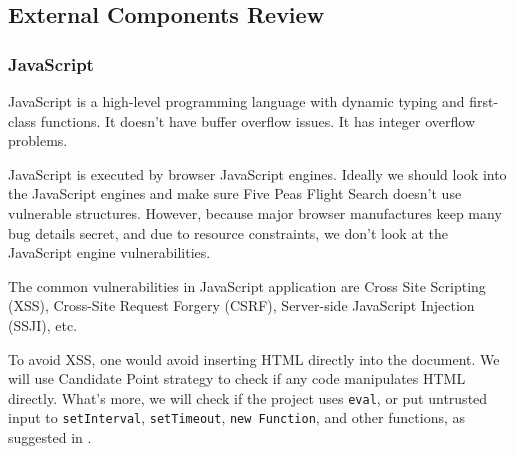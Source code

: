\documentclass[12pt, a4paper]{article}
\newcommand{\code}[1]{\texttt{#1}}
\begin{document}
\subsection{External Components Review}
\label{dependency-evaluation}










\subsubsection{JavaScript}
JavaScript is a high-level programming language with dynamic typing and first-class functions. It doesn't have buffer overflow issues. It has integer overflow problems.

JavaScript is executed by browser JavaScript engines. Ideally we should look into the JavaScript engines and make sure Five Peas Flight Search doesn't use vulnerable structures. However, because major browser manufactures\textsuperscript{\cite{chrome-update}} keep many bug details secret, and due to resource constraints, we don't look at the JavaScript engine vulnerabilities.

The common vulnerabilities in JavaScript application are Cross Site Scripting (XSS), Cross-Site Request Forgery (CSRF), Server-side JavaScript Injection (SSJI), etc. 

To avoid XSS, one would avoid inserting HTML directly into the document. We will use Candidate Point strategy to check if any code manipulates HTML directly. What's more, we will check if the project uses \code{eval}, or put untrusted input to \code{setInterval}, \code{setTimeout}, \code{new Function}, and other functions, as suggested in \cite{secure-javascript}.






\end{document}
